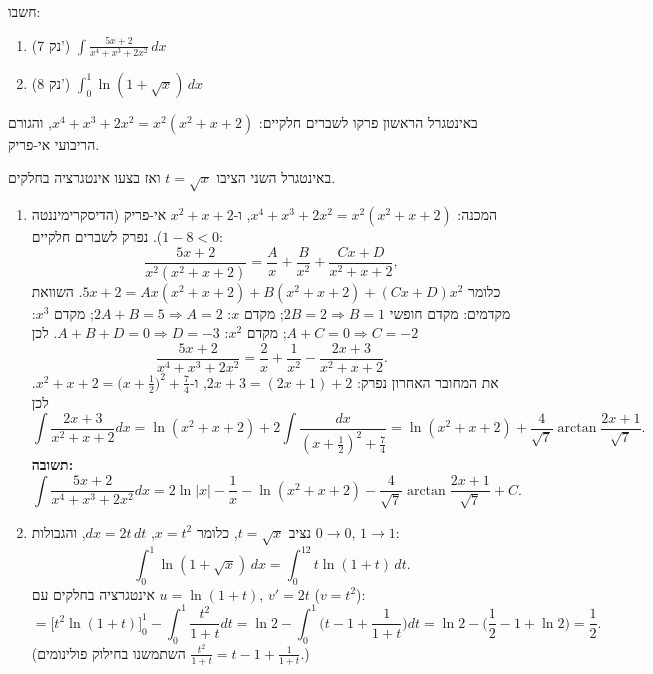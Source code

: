 
\begin{question}
חשבו:
\begin{enumerate}
  \item (7 נק') $\displaystyle\int\frac{5x+2}{x^4+x^3+2x^2}\,dx$
  \item (8 נק') $\displaystyle\int_0^1\ln(1+\sqrt{x})\,dx$
\end{enumerate}
\end{question}

\begin{hint}
באינטגרל הראשון פרקו לשברים חלקיים: $x^4+x^3+2x^2=x^2(x^2+x+2)$, והגורם הריבועי אי-פריק.
\end{hint}

\begin{hint}
באינטגרל השני הציבו $t=\sqrt x$ ואז בצעו אינטגרציה בחלקים.
\end{hint}

\begin{solution}
\begin{enumerate}
  \item המכנה: $x^4+x^3+2x^2=x^2(x^2+x+2)$, ו-$x^2+x+2$ אי-פריק (הדיסקרימיננטה $1-8<0$). נפרק לשברים חלקיים:
  \[ \frac{5x+2}{x^2(x^2+x+2)}=\frac{A}{x}+\frac{B}{x^2}+\frac{Cx+D}{x^2+x+2}, \]
  כלומר $5x+2=Ax(x^2+x+2)+B(x^2+x+2)+(Cx+D)x^2$. השוואת מקדמים: מקדם חופשי $2B=2\Rightarrow B=1$; מקדם $x$: $2A+B=5\Rightarrow A=2$; מקדם $x^3$: $A+C=0\Rightarrow C=-2$; מקדם $x^2$: $A+B+D=0\Rightarrow D=-3$. לכן
  \[ \frac{5x+2}{x^4+x^3+2x^2}=\frac{2}{x}+\frac{1}{x^2}-\frac{2x+3}{x^2+x+2}. \]
  את המחובר האחרון נפרק: $2x+3=(2x+1)+2$, ו-$x^2+x+2=\big(x+\frac12\big)^2+\frac74$. לכן
  \[ \int\frac{2x+3}{x^2+x+2}dx=\ln(x^2+x+2)+2\int\frac{dx}{(x+\frac12)^2+\frac74}=\ln(x^2+x+2)+\frac{4}{\sqrt7}\arctan\frac{2x+1}{\sqrt7}. \]
  \textbf{תשובה:}
  \[ \int\frac{5x+2}{x^4+x^3+2x^2}dx=2\ln|x|-\frac1x-\ln(x^2+x+2)-\frac{4}{\sqrt7}\arctan\frac{2x+1}{\sqrt7}+C . \]
  \item נציב $t=\sqrt x$, כלומר $x=t^2$, $dx=2t\,dt$, והגבולות $0\to0$, $1\to1$:
  \[ \int_0^1\ln(1+\sqrt x)\,dx=\int_0^12t\ln(1+t)\,dt . \]
  אינטגרציה בחלקים עם $u=\ln(1+t)$, $v'=2t$ ($v=t^2$):
  \[ =\Big[t^2\ln(1+t)\Big]_0^1-\int_0^1\frac{t^2}{1+t}dt=\ln2-\int_0^1\Big(t-1+\frac{1}{1+t}\Big)dt=\ln2-\Big(\frac12-1+\ln2\Big)=\boxed{\frac12} . \]
  (השתמשנו בחילוק פולינומים $\frac{t^2}{1+t}=t-1+\frac{1}{1+t}$.)
\end{enumerate}
\end{solution}
